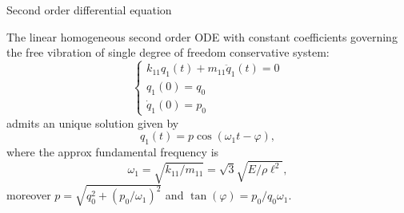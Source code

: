 \documentclass[aspectratio=169]{beamer}
\begin{document}
{
\begin{frame}{Second order differential equation}
  \begin{block}{}
    The linear homogeneous second order ODE with constant coefficients governing the free vibration of single degree of
    freedom conservative system:
    $$\begin{cases}
        k_{11}q_{1}(t)+m_{11}\ddot q_{1}(t)=0 \\
        q_{1}(0)= q_{0}                       \\
        {\dot q}_{1}(0)= p_{0}
      \end{cases}$$
    admits an unique solution given by
    $$q_{1}(t)=p\cos(\omega_{1} t-\varphi),$$
    where the approx fundamental frequency is
    $$\omega_{1}=\sqrt{k_{11}/m_{11}}=\sqrt3\sqrt{E/\rho\ell^2},$$
    moreover $p=\sqrt{q_{0}^{2}+(p_{0}/\omega_1)^{2}}$ and $\tan(\varphi)=p_{0}/q_{0}\omega_1$.
  \end{block}
\end{frame}
}
\end{document}

